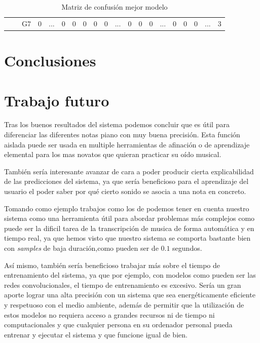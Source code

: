 \documentclass[12pt]{article}
\begin{document}
\begin{table}[!ht]
{\begin{tabular}{clcccccccccccccccccc}
                       & \multicolumn{1}{l|}{} & \multicolumn{1}{c|}{G7}   & \multicolumn{1}{c|}{0}    & \multicolumn{1}{c|}{...}                  & \multicolumn{1}{c|}{0}    & \multicolumn{1}{c|}{0}    & \multicolumn{1}{c|}{0}    & \multicolumn{1}{c|}{0}    & \multicolumn{1}{c|}{0}  & \multicolumn{1}{c|}{...}                  & \multicolumn{1}{c|}{0}    & \multicolumn{1}{c|}{0}    & \multicolumn{1}{c|}{0}    & \multicolumn{1}{c|}{...}                  & \multicolumn{1}{c|}{0}  & \multicolumn{1}{c|}{0}  & \multicolumn{1}{c|}{0}  & \multicolumn{1}{c|}{...}                  & \multicolumn{1}{c|}{3}  \\ \cline{3-20} 
\end{tabular}
	}
	\caption{Matriz de confusión mejor modelo}
	\label{Tab:confusion_matrix_6}
\end{table}

\newpage
\section{Conclusiones}
\label{Conclusiones}

\newpage

\section{Trabajo futuro}
\label{Trabajo futuro}

Tras los buenos resultados del sistema podemos concluir que es útil para diferenciar las diferentes notas piano con muy buena precisión. 
Esta función aislada puede ser usada en multiple herramientas de afinación o de aprendizaje elemental para los mas novatos que quieran practicar su oído musical.

También sería interesante avanzar de cara a poder producir cierta explicabilidad de las predicciones
del sistema, ya que sería beneficioso para el aprendizaje del usuario el poder saber por qué cierto
sonido se asocia a una nota en concreto.


\bigskip
Tomando como ejemplo trabajos como los de \cite{klapuri2004signal} podemos tener en cuenta nuestro sistema como una herramienta útil para abordar problemas
más complejos como puede ser la dificil tarea de la transcripción de musica de forma automática y en tiempo real,
ya que hemos visto que nuestro sistema se comporta bastante bien con \textit{samples} de baja duración,como pueden ser de $0.1$ segundos.

\bigskip
Así mismo, también sería beneficioso trabajar más sobre el tiempo de entrenamiento del sistema, ya que por ejemplo,
con modelos como pueden ser las redes convolucionales, el tiempo de entrenamiento es excesivo. Sería un gran aporte
lograr una alta precisión con un sistema que sea energéticamente eficiente y respetuoso con el medio ambiente, además de
permitir que la utilización de estos modelos no requiera acceso a grandes recursos ni de tiempo ni computacionales
y que cualquier persona en su ordenador personal pueda entrenar y ejecutar el sistema y que funcione igual de bien.
\end{document}
